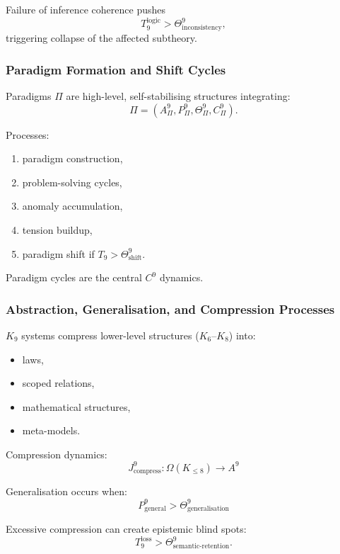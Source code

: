 Failure of inference coherence pushes 
\[
T_9^{\text{logic}} > \Theta^9_{\text{inconsistency}},
\]
triggering collapse of the affected subtheory.

\subsubsection{Paradigm Formation and Shift Cycles}

Paradigms $\Pi$ are high-level, self-stabilising structures integrating:
\[
\Pi = (A^9_{\Pi}, P^9_{\Pi}, \Theta^9_{\Pi}, C^9_{\Pi}).
\]

Processes:
\begin{enumerate}
    \item paradigm construction,
    \item problem-solving cycles,
    \item anomaly accumulation,
    \item tension buildup,
    \item paradigm shift if $T_9 > \Theta^9_{\text{shift}}$.
\end{enumerate}

Paradigm cycles are the central $C^9$ dynamics.

\subsubsection{Abstraction, Generalisation, and Compression Processes}

$K_9$ systems compress lower-level structures ($K_6$–$K_8$) into:
\begin{itemize}
    \item laws,
    \item scoped relations,
    \item mathematical structures,
    \item meta-models.
\end{itemize}

Compression dynamics:
\[
J^9_{\text{compress}} : \Omega(K_{\leq 8}) \to A^9
\]

Generalisation occurs when:
\[
P^9_{\text{general}} > \Theta^9_{\text{generalisation}}
\]

Excessive compression can create epistemic blind spots:
\[
T_9^{\text{loss}} > \Theta^9_{\text{semantic-retention}}.
\]

